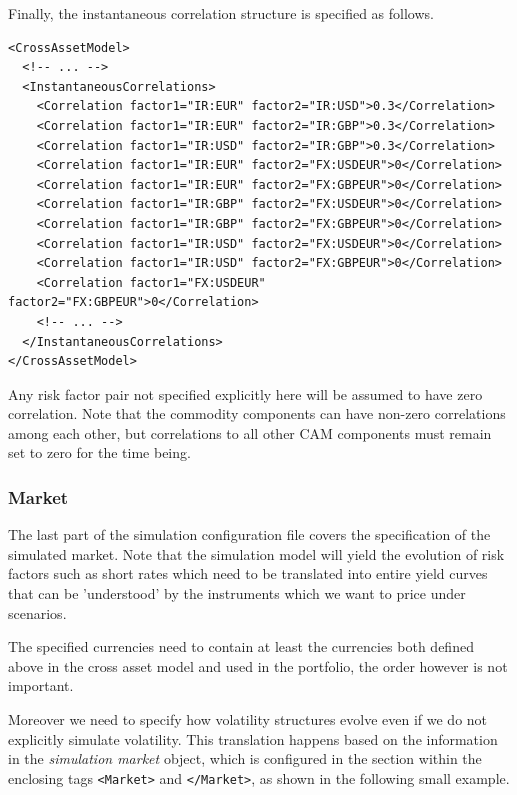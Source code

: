 \medskip
Finally, the instantaneous correlation structure is specified as follows.

\begin{listing}[H]
\begin{verbatim}
<CrossAssetModel>
  <!-- ... -->
  <InstantaneousCorrelations>
    <Correlation factor1="IR:EUR" factor2="IR:USD">0.3</Correlation>
    <Correlation factor1="IR:EUR" factor2="IR:GBP">0.3</Correlation>
    <Correlation factor1="IR:USD" factor2="IR:GBP">0.3</Correlation>
    <Correlation factor1="IR:EUR" factor2="FX:USDEUR">0</Correlation>
    <Correlation factor1="IR:EUR" factor2="FX:GBPEUR">0</Correlation>
    <Correlation factor1="IR:GBP" factor2="FX:USDEUR">0</Correlation>
    <Correlation factor1="IR:GBP" factor2="FX:GBPEUR">0</Correlation>
    <Correlation factor1="IR:USD" factor2="FX:USDEUR">0</Correlation>
    <Correlation factor1="IR:USD" factor2="FX:GBPEUR">0</Correlation>
    <Correlation factor1="FX:USDEUR" factor2="FX:GBPEUR">0</Correlation>
    <!-- ... -->
  </InstantaneousCorrelations>
</CrossAssetModel>
\end{verbatim}
\caption{Simulation model correlation configuration}
\label{lst:simulation_model_correlation_configuration}
\end{listing}

Any risk factor pair not specified explicitly here will be assumed to have zero correlation. Note that the commodity components can have non-zero correlations among each other, but correlations to all other CAM components must remain set to zero for the time being.

\subsubsection{Market}\label{sec:sim_market}

The last part of the simulation configuration file covers the specification of the simulated market.  Note that the
simulation model will yield the evolution of risk factors such as short rates which need to be translated into entire
yield curves that can be 'understood' by the instruments which we want to price under scenarios.

The specified currencies need to contain at least the currencies both defined above in the cross asset model and used in the portfolio, the order however is not important.

Moreover we need to specify how volatility structures evolve even if we do not explicitly simulate volatility. This
translation happens based on the information in the {\em simulation market} object, which is configured in the section
within the enclosing tags {\tt <Market>} and {\tt </Market>}, as shown in the following small example.

